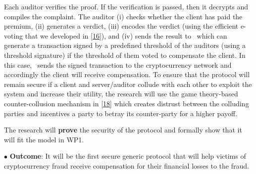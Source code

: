 Each auditor verifies the proof. If the verification is passed, then it decrypts and compiles the complaint. The auditor (i) checks whether the client has paid the premium, (ii) generates a verdict, (iii) encodes the verdict (using the efficient e-voting that we developed in \href{https://eprint.iacr.org/2022/107.pdf}{[16]}), and (iv) sends the result to \cs\ which can generate a transaction signed by a predefined threshold of the auditors (using a threshold signature) if the threshold of them voted to compensate the client. In this case, \cs\ sends the signed transaction to the cryptocurrency network and accordingly the client will receive compensation.  
%
To ensure that the protocol will remain secure if a client and server/auditor collude with each other to exploit the system and increase their utility, the research will use the game theory-based counter-collusion mechanism in \href{https://dl.acm.org/doi/10.1145/3133956.3134032}{[18]} which creates distrust between the colluding parties and incentives a party to betray its counter-party for a higher payoff. 

The research will \textbf{prove} the security of the protocol and formally show that it will fit the model in WP1.  

 
 
 \noindent$\bullet$\textbf{ Outcome}: It will be the first secure generic protocol that will help victims of cryptocurrency fraud receive compensation for their financial losses to the fraud. 
 
 
 
 
 
 
 
 
